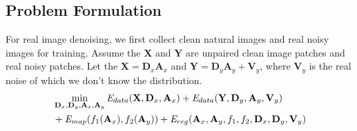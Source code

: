 \documentclass[10pt,twocolumn,letterpaper]{article}
\begin{document}
\subsection{Problem Formulation}
For real image denoising, we first collect clean natural images and real noisy images for training. Assume the $\mathbf{X}$ and $\mathbf{Y}$ are unpaired clean image patches and real noisy patches. Let the $\mathbf{X} = \mathbf{D}_{x}\mathbf{A}_{x}$ and $\mathbf{Y} = \mathbf{D}_{y}\mathbf{A}_{y}+\mathbf{V}_{y}$, where $\mathbf{V}_{y}$ is the real noise of which we don't know the distribution. 
\begin{equation}
\begin{split}
&\min_{\mathbf{D}_{x},\mathbf{D}_{y},\mathbf{A}_{x},\mathbf{A}_{y}}
\emph{E}_{data}(\mathbf{X},\mathbf{D}_{x},\mathbf{A}_{x})+
\emph{E}_{data}(\mathbf{Y},\mathbf{D}_{y},\mathbf{A}_{y},\mathbf{V}_{y})
\\
&
+\emph{E}_{map}(f_{1}(\mathbf{A}_{x}),f_{2}(\mathbf{A}_{y}))+
\emph{E}_{reg}(\mathbf{A}_{x},\mathbf{A}_{y},f_{1},f_{2},\mathbf{D}_{x},\mathbf{D}_{y},\mathbf{V}_{y})
\end{split}
\end{equation}
\end{document}
